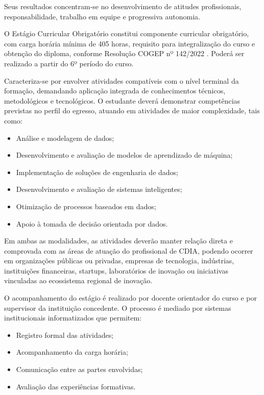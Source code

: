 Seus resultados concentram-se no desenvolvimento de atitudes profissionais, responsabilidade, trabalho em equipe e progressiva autonomia.

O Estágio Curricular Obrigatório constitui componente curricular obrigatório, com carga horária mínima de 405 horas, requisito para integralização do curso e obtenção do diploma, conforme Resolução COGEP nº 142/2022 \cite{UTFPR_DC_2022}. Poderá ser realizado a partir do 6º período do curso.

Caracteriza-se por envolver atividades compatíveis com o nível terminal da formação, demandando aplicação integrada de conhecimentos técnicos, metodológicos e tecnológicos. O estudante deverá demonstrar competências previstas no perfil do egresso, atuando em atividades de maior complexidade, tais como:

\begin{itemize}
    \item Análise e modelagem de dados;
    \item Desenvolvimento e avaliação de modelos de aprendizado de máquina;
    \item Implementação de soluções de engenharia de dados;
    \item Desenvolvimento e avaliação de sistemas inteligentes;
    \item Otimização de processos baseados em dados;
    \item Apoio à tomada de decisão orientada por dados.
\end{itemize}

Em ambas as modalidades, as atividades deverão manter relação direta e comprovada com as áreas de atuação do profissional de CDIA, podendo ocorrer em organizações públicas ou privadas, empresas de tecnologia, indústrias, instituições financeiras, startups, laboratórios de inovação ou iniciativas vinculadas ao ecossistema regional de inovação.

O acompanhamento do estágio é realizado por docente orientador do curso e por supervisor da instituição concedente. O processo é mediado por sistemas institucionais informatizados que permitem:

\begin{itemize}
    \item Registro formal das atividades;
    \item Acompanhamento da carga horária;
    \item Comunicação entre as partes envolvidas;
    \item Avaliação das experiências formativas.
\end{itemize}

